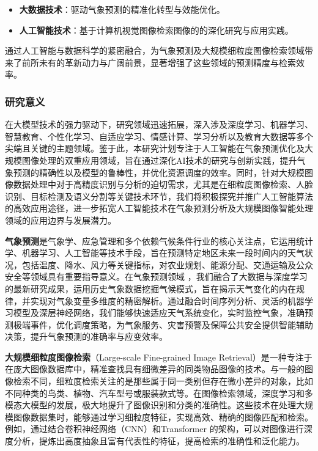 \begin{itemize}[leftmargin=3em]
    \item \textbf{大数据技术}：驱动气象预测的精准化转型与效能优化。
    \item \textbf{人工智能技术}：基于计算机视觉图像检索图像的的深化研究与应用实践。
\end{itemize}

通过人工智能与数据科学的紧密融合，为气象预测及大规模细粒度图像检索领域带来了前所未有的革新动力与广阔前景，显著增强了这些领域的预测精度与检索效率。

\subsubsection{研究意义}

在大模型技术的强力驱动下，研究领域迅速拓展，深入涉及深度学习、机器学习、智慧教育、个性化学习、自适应学习、情感计算、学习分析以及教育大数据等多个尖端且关键的主题领域。鉴于此，本研究计划专注于人工智能在气象预测优化及大规模图像处理的双重应用领域，旨在通过深化AI技术的研究与创新实践，提升气象预测的精确性以及模型的鲁棒性，并优化资源调度的效率。同时，针对大规模图像数据处理中对于高精度识别与分析的迫切需求，尤其是在细粒度图像检索、人脸识别、目标检测及语义分割等关键技术环节，我们将积极探究并推广人工智能算法的高效应用途径，进一步拓宽人工智能技术在气象预测分析及大规模图像智能处理领域的应用边界与发展潜力。

\textbf{气象预测}是气象学、应急管理和多个依赖气候条件行业的核心关注点，它运用统计学、机器学习、人工智能等技术手段，旨在预测特定地区未来一段时间内的天气状况，包括温度、降水、风力等关键指标，对农业规划、能源分配、交通运输及公众安全等领域具有重要指导意义。在气象预测领域 \cite{HJKZ2024011600J}，我们融合了大数据与深度学习的最新研究成果，运用历史气象数据挖掘气候模式，旨在揭示天气变化的内在规律，并实现对气象变量多维度的精密解析。通过融合时间序列分析、灵活的机器学习模型及深层神经网络，我们能够快速适应天气系统变化，实时监控气象，准确预测极端事件，优化调度策略，为气象服务、灾害预警及保障公共安全提供智能辅助决策，提升气象预测的准确率与应变效率。

\textbf{大规模细粒度图像检索}（Large-scale Fine-grained Image Retrieval）是一种专注于在庞大图像数据库中，精准查找具有细微差异的同类物品图像的技术。与一般的图像检索不同，细粒度检索关注的是那些属于同一类别但存在微小差异的对象，比如不同种类的鸟类、植物、汽车型号或服装款式等。在图像检索领域，深度学习和多模态大模型的发展，极大地提升了图像识别和分类的准确性。这些技术在处理大规模图像数据集时，能够通过学习细粒度特征，实现高效、精确的图像匹配和检索。例如，通过结合卷积神经网络（CNN）\cite{LeCun2015}和Transformer \cite{vaswani2023attention} 的架构，可以对图像进行深度分析，提炼出高度抽象且富有代表性的特征，提高检索的准确性和泛化能力。

